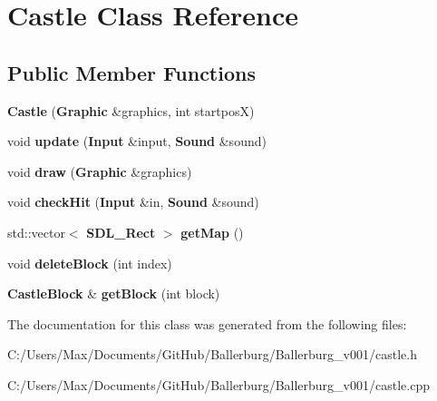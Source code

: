 \section{Castle Class Reference}
\label{class_castle}
\subsection*{Public Member Functions}
\begin{DoxyCompactItemize}
\item 
{\bfseries Castle} ({\bf Graphic} \&graphics, int startpos\+X)\label{class_castle_ab5ec93846d60e52722de92e45c753d4b}

\item 
void {\bfseries update} ({\bf Input} \&input, {\bf Sound} \&sound)\label{class_castle_a88b3dd90f1c6a9bc4f84deb5bed8ea97}

\item 
void {\bfseries draw} ({\bf Graphic} \&graphics)\label{class_castle_a0b25b9dead62c64e7e48a587453b1138}

\item 
void {\bfseries check\+Hit} ({\bf Input} \&in, {\bf Sound} \&sound)\label{class_castle_a8c40e91a3d1ae3dba9003607736c8076}

\item 
std\+::vector$<$ {\bf S\+D\+L\+\_\+\+Rect} $>$ {\bfseries get\+Map} ()\label{class_castle_a94e009f51990bf1fe4e65c6809848480}

\item 
void {\bfseries delete\+Block} (int index)\label{class_castle_a33d197526444e9899ff601342671efe2}

\item 
{\bf Castle\+Block} \& {\bfseries get\+Block} (int block)\label{class_castle_a540a311c65db41018f12a9da996f01b4}

\end{DoxyCompactItemize}


The documentation for this class was generated from the following files\+:\begin{DoxyCompactItemize}
\item 
C\+:/\+Users/\+Max/\+Documents/\+Git\+Hub/\+Ballerburg/\+Ballerburg\+\_\+v001/castle.\+h\item 
C\+:/\+Users/\+Max/\+Documents/\+Git\+Hub/\+Ballerburg/\+Ballerburg\+\_\+v001/castle.\+cpp\end{DoxyCompactItemize}
